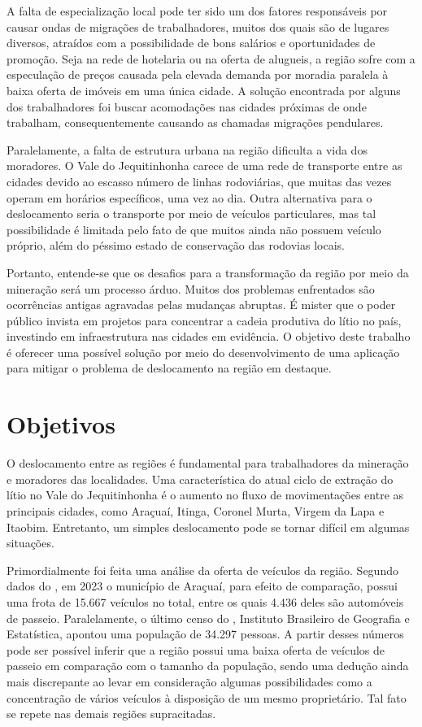 A falta de especialização local pode ter sido um dos fatores responsáveis por causar ondas de migrações de trabalhadores, muitos dos quais são de lugares diversos, atraídos com a possibilidade de bons salários e oportunidades de promoção. Seja na rede de hotelaria ou na oferta de alugueis, a região sofre com a especulação de preços causada pela elevada demanda por moradia paralela à baixa oferta de imóveis em uma única cidade. A solução encontrada por alguns dos trabalhadores foi buscar acomodações nas cidades próximas de onde trabalham, consequentemente causando as chamadas migrações pendulares.

Paralelamente, a falta de estrutura urbana na região dificulta a vida dos moradores. O Vale do Jequitinhonha carece de uma rede de transporte entre as cidades devido ao escasso número de linhas rodoviárias, que muitas das vezes operam em horários específicos, uma vez ao dia. Outra alternativa para o deslocamento seria o transporte por meio de veículos particulares, mas tal possibilidade é limitada pelo fato de que muitos ainda não possuem veículo próprio, além do péssimo estado de conservação das rodovias locais.

Portanto, entende-se que os desafios para a transformação da região por meio da mineração será um processo árduo. Muitos dos problemas enfrentados são ocorrências antigas agravadas pelas mudanças abruptas. É mister que o poder público invista em projetos para concentrar a cadeia produtiva do lítio no país, investindo em infraestrutura nas cidades em evidência. O objetivo deste trabalho é oferecer uma possível solução por meio do desenvolvimento de uma aplicação para mitigar o problema de deslocamento na região em destaque.

\section{Objetivos}

O deslocamento entre as regiões é fundamental para trabalhadores da mineração e moradores das localidades. Uma característica do atual ciclo de extração do lítio no Vale do Jequitinhonha é o aumento no fluxo de movimentações entre as principais cidades, como Araçuaí, Itinga, Coronel Murta, Virgem da Lapa e Itaobim. Entretanto, um simples deslocamento pode se tornar difícil em algumas situações.

Primordialmente foi feita uma análise da oferta de veículos da região. Segundo dados do  , em 2023 o município de Araçuaí, para efeito de comparação, possui uma frota de 15.667 veículos no total, entre os quais 4.436 deles são automóveis de passeio. Paralelamente, o último censo do , Instituto Brasileiro de Geografia e Estatística, apontou uma população de 34.297 pessoas. A partir desses números pode ser possível inferir que a região possui uma baixa oferta de veículos de passeio em comparação com o tamanho da população, sendo uma dedução ainda mais discrepante ao levar em consideração algumas possibilidades como a concentração de vários veículos à disposição de um mesmo proprietário. Tal fato se repete nas demais regiões supracitadas.

